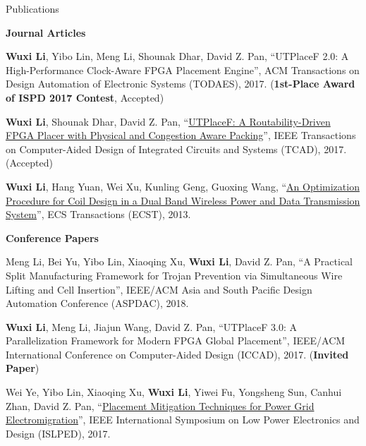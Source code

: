 \begin{rSection}{Publications}

\textbf{Journal Articles}
\begin{description}[font=\normalfont]
\item[{[J3]}]{
    \textbf{Wuxi Li}, Yibo Lin, Meng Li, Shounak Dhar, David Z. Pan,
    ``UTPlaceF 2.0: A High-Performance Clock-Aware FPGA Placement Engine'',
    ACM Transactions on Design Automation of Electronic Systems (TODAES), 2017.
    (\textbf{1st-Place Award of ISPD 2017 Contest}, Accepted)
}

\item[{[J2]}]{
    \textbf{Wuxi Li}, Shounak Dhar, David Z. Pan,
    ``\href{http://ieeexplore.ieee.org/document/7984833/}{UTPlaceF: A Routability-Driven FPGA Placer with Physical and Congestion Aware Packing}'',
    IEEE Transactions on Computer-Aided Design of Integrated Circuits and Systems (TCAD), 2017.
    (Accepted)
}

\item[{[J1]}]{
    \textbf{Wuxi Li}, Hang Yuan, Wei Xu, Kunling Geng, Guoxing Wang,
    ``\href{http://ecst.ecsdl.org/content/52/1/1091.short}{An Optimization Procedure for Coil Design in a Dual Band Wireless Power and Data Transmission System}'',
    ECS Transactions (ECST), 2013.
}

\end{description}

\textbf{Conference Papers}
\begin{description}[font=\normalfont]
\item[{[C5]}]{
    Meng Li, Bei Yu, Yibo Lin, Xiaoqing Xu, \textbf{Wuxi Li}, David Z. Pan,
    ``A Practical Split Manufacturing Framework for Trojan Prevention via Simultaneous Wire Lifting and Cell Insertion'',
    IEEE/ACM Asia and South Pacific Design Automation Conference (ASPDAC), 2018.
}

\item[{[C4]}]{
    \textbf{Wuxi Li}, Meng Li, Jiajun Wang, David Z. Pan,
    ``UTPlaceF 3.0: A Parallelization Framework for Modern FPGA Global Placement'',
    IEEE/ACM International Conference on Computer-Aided Design (ICCAD), 2017.
    (\textbf{Invited Paper})
}

\item[{[C3]}]{
    Wei Ye, Yibo Lin, Xiaoqing Xu, \textbf{Wuxi Li}, Yiwei Fu, Yongsheng Sun, Canhui Zhan, David Z. Pan,
    ``\href{http://ieeexplore.ieee.org/document/8009178/}{Placement Mitigation Techniques for Power Grid Electromigration}'',
    IEEE International Symposium on Low Power Electronics and Design (ISLPED), 2017.
}


\end{description}
\end{rSection}
